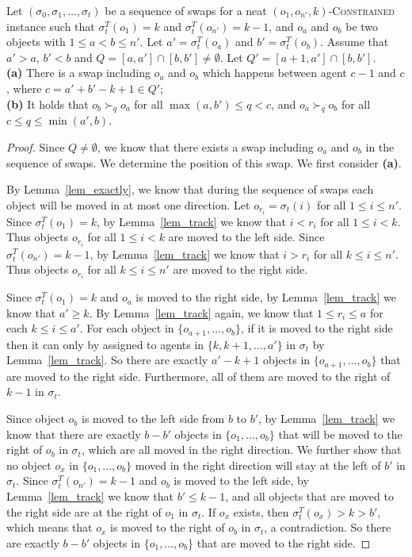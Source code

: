 \begin{lemma}\label{prop2}
Let $(\sigma _0,\sigma _1,\dots,\sigma _t)$ be a sequence of swaps for a neat $(o_1,o_{n'},k)$-\textsc{Constrained} instance
such that $\sigma^T_t(o_1)=k$ and $\sigma^T_t(o_{n'})=k-1$, and $o_a$ and $o_b$
be two objects with $1\leq a<b\leq n'$. Let $a'=\sigma^T_t(o_a)$ and $b'=\sigma^T_t(o_b)$.
Assume that $a'>a$, $b'<b$ and $Q=[a,a']\cap [b,b']\neq \emptyset$. Let $Q'=[a+1,a']\cap [b,b']$.\\
\textbf{(a)} There is a swap including $o_a$ and $o_b$ which happens between agent $c-1$ and $c$, where $c=a'+b'-k+1\in Q'$; \\
\textbf{(b)} It holds that $o_b \succ_q o_a$ for all $\max(a,b')\leq q < c$, and $o_a \succ_q o_b$ for all $c \leq q \leq \min(a',b)$.
\end{lemma}
\begin{proof}
    Since $Q\neq \emptyset$, we know that there exists a swap including $o_a$ and $o_b$ in the sequence of swaps. We determine the position of this swap. We first consider \textbf{(a)}.

    By Lemma~\ref{lem_exactly}, we know that during the sequence of swaps each object will be moved in at most one direction.
    Let $o_{r_i}=\sigma_t(i)$ for all $1\leq i\leq n'$. Since $\sigma^T_t(o_1)=k$, by Lemma~\ref{lem_track} we know that $i<r_i$ for all $1\leq i<k$. Thus objects $o_{r_i}$ for all $1\leq i<k$ are moved
    to the left side. Since $\sigma^T_t(o_{n'})=k-1$, by Lemma~\ref{lem_track} we know that $i>r_i$ for all $k\leq i\leq n'$.
    Thus objects $o_{r_i}$ for all $k\leq i\leq n'$ are moved to the right side.

    Since $\sigma^T_t(o_1)=k$ and $o_a$ is moved to the right side, by Lemma~\ref{lem_track} we know that $a'\geq k$.
    By Lemma~\ref{lem_track} again, we know that   $1\leq r_i\leq a$   for each $k\leq i \leq a'$.
    For each object in $\{o_{a+1},\dots,o_b\}$, if it is moved to the right side then it can only by assigned to agents in $\{k, k+1,\dots, a'\}$ in $\sigma _t$ by Lemma~\ref{lem_track}.
    So there are exactly $a'-k+1$ objects in $\{o_{a+1},\dots,o_b\}$ that are moved to the right side. Furthermore, all of them are moved to the right of $k-1$ in $\sigma _t$.

    Since object $o_b$ is moved to the left side from $b$ to $b'$, by Lemma~\ref{lem_track} we know that there are exactly $b-b'$ objects in
    $\{o_1,\dots,o_b\}$ that will be moved to the right of $o_b$ in $\sigma _t$, which are all moved in the right direction.
    We further show that no object $o_x$ in $\{o_1,\dots,o_b\}$ moved in the right direction will stay at the left of $b'$ in $\sigma _t$.
    Since $\sigma^T_t(o_{n'})=k-1$ and $o_b$ is moved to the left side,
    by Lemma~\ref{lem_track} we know that $b'\leq k-1$, and all objects that are moved to the right side are at the right of $o_1$ in $\sigma_t$. If $o_x$ exists, then  $\sigma_t^T(o_x)>k>b'$, which means that $o_x$ is moved to the right of $o_b$ in $\sigma_t$, a contradiction.
    So there are exactly $b-b'$ objects in $\{ o_1,\dots,o_b\}$ that are moved to the right side.


\end{proof}
